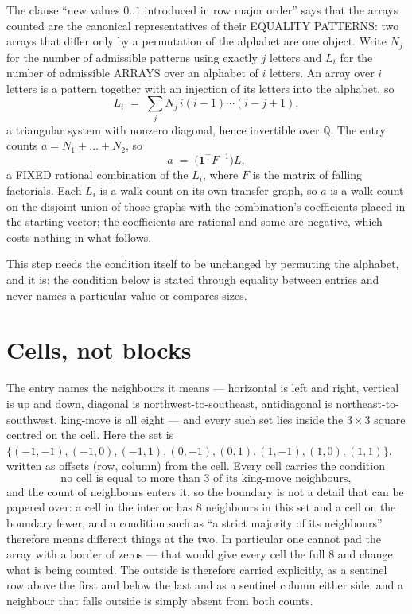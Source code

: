 \documentclass[11pt,a4paper]{article}
\theoremstyle{plain}
\theoremstyle{definition}
\begin{document}
The clause ``new values $0..1$ introduced in row major order'' says that the arrays
counted are the canonical representatives of their EQUALITY PATTERNS: two arrays that differ
only by a permutation of the alphabet are one object. Write $N_j$ for the number of admissible
patterns using exactly $j$ letters and $L_i$ for the number of admissible ARRAYS over an
alphabet of $i$ letters. An array over $i$ letters is a pattern together with an injection of
its letters into the alphabet, so
\[
L_i\;=\;\sum_{j}N_j\,i(i-1)\cdots(i-j+1),
\]
a triangular system with nonzero diagonal, hence invertible over $\mathbb{Q}$. The entry
counts $a=N_1+\dots+N_{2}$, so
\[
a\;=\;\bigl(\mathbf{1}^{\!\top}F^{-1}\bigr)L ,
\]
a FIXED rational combination of the $L_i$, where $F$ is the matrix of falling factorials.
Each $L_i$ is a walk count on its own transfer graph, so $a$ is a walk count on the disjoint
union of those graphs with the combination's coefficients placed in the starting vector; the
coefficients are rational and some are negative, which costs nothing in what follows.

This step needs the condition itself to be unchanged by permuting the alphabet, and it is:
the condition below is stated through equality between entries and never names a particular
value or compares sizes.

\section{Cells, not blocks}

The entry names the neighbours it means --- horizontal is left and right, vertical is up and
down, diagonal is northwest-to-southeast, antidiagonal is northeast-to-southwest, king-move is
all eight --- and every such set lies inside the $3\times3$ square centred on the cell. Here
the set is $\{(-1,-1), (-1,0), (-1,1), (0,-1), (0,1), (1,-1), (1,0), (1,1)\}$, written as offsets (row, column) from the cell. Every cell carries
the condition
\[
\text{no cell is equal to more than 3 of its king-move neighbours},
\]
and the count of neighbours enters it, so the boundary is not a detail that can be papered
over: a cell in the interior has $8$ neighbours in this set and a cell on the boundary
fewer, and a condition such as ``a strict majority of its neighbours'' therefore means
different things at the two. In particular one cannot pad the array with a border of zeros ---
that would give every cell the full $8$ and change what is being counted. The outside is
therefore carried
explicitly, as a sentinel row above the first and below the last and as a sentinel column
either side, and a neighbour that falls outside is simply absent from both counts.
\end{document}
